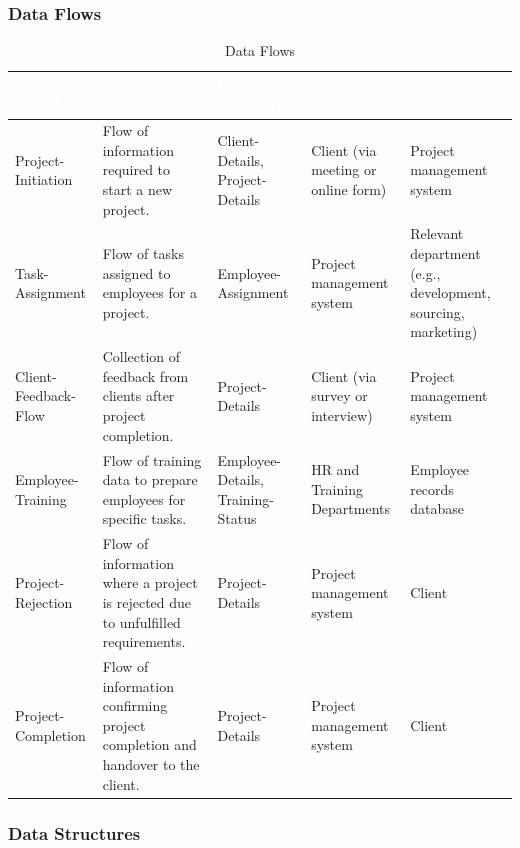 \documentclass[12pt,a4paper]{article}
\begin{document}
\subsubsection{Data Flows}

\begin{table}[H]
\centering
\begin{tabular}{|p{2.5cm}|p{3cm}|p{3cm}|p{3cm}|p{3cm}|}
\hline
\rowcolor{headercolor}
\textcolor{white}{\textbf{Data Flow}} & \textcolor{white}{\textbf{Description}} & \textcolor{white}{\textbf{Data Structures}} & \textcolor{white}{\textbf{Source}} & \textcolor{white}{\textbf{Destination}} \\
\hline
Project-Initiation & Flow of information required to start a new project. & Client-Details, Project-Details & Client (via meeting or online form) & Project management system \\
\hline
Task-Assignment & Flow of tasks assigned to employees for a project. & Employee-Assignment & Project management system & Relevant department (e.g., development, sourcing, marketing) \\
\hline
Client-Feedback-Flow & Collection of feedback from clients after project completion. & Project-Details & Client (via survey or interview) & Project management system \\
\hline
Employee-Training & Flow of training data to prepare employees for specific tasks. & Employee-Details, Training-Status & HR and Training Departments & Employee records database \\
\hline
Project-Rejection & Flow of information where a project is rejected due to unfulfilled requirements. & Project-Details & Project management system & Client \\
\hline
Project-Completion & Flow of information confirming project completion and handover to the client. & Project-Details & Project management system & Client \\
\hline
\end{tabular}
\caption{Data Flows}
\end{table}

\subsubsection{Data Structures}
\end{document}
